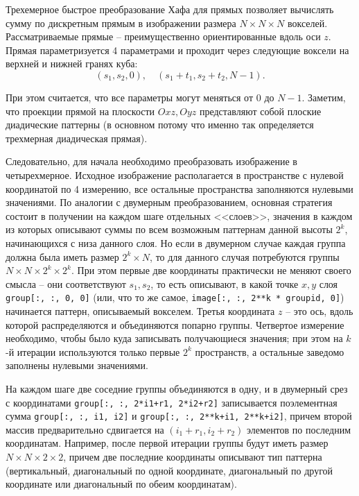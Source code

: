 
Трехемерное быстрое преобразование Хафа для прямых позволяет вычислять сумму по дискретным прямым в изображении размера $N \times N \times N$ вокселей. Рассматриваемые прямые -- преимущественно ориентированные вдоль оси $z$. Прямая параметризуется 4 параметрами и проходит через следующие воксели на верхней и нижней гранях куба:
\begin{equation*}
    (s_1, s_2, 0), \quad
    (s_1 + t_1, s_2 + t_2, N-1).
\end{equation*}

При этом считается, что все параметры могут меняться от $0$ до $N-1$. Заметим, что проекции прямой на плоскости $Oxz, Oyz$ представляют собой плоские диадические паттерны (в основном потому что именно так определяется трехмерная диадическая прямая).

Следовательно, для начала необходимо преобразовать изображение в четырехмерное. Исходное изображение располагается в пространстве с нулевой координатой по 4 измерению, все остальные пространства заполняются нулевыми значениями.
По аналогии с двумерным преобразованием, основная стратегия состоит в получении на каждом шаге отдельных <<слоев>>, значения в каждом из которых описывают суммы по всем возможным паттернам данной высоты $2^k$, начинающихся с низа данного слоя.
Но если в двумерном случае каждая группа должна была иметь размер $2^k \times N$, то для данного случая потребуются группы $N \times N \times 2^k \times 2^k$.
При этом первые две координаты практически не меняют своего смысла -- они соответствуют $s_1, s_2$, то есть описывают, в какой точке $x, y$ слоя \texttt{group[:, :, 0, 0]} (или, что то же самое, \texttt{image[:, :, 2**k * groupid, 0]}) начинается паттерн, описываемый вокселем. Третья координата $z$ -- это ось, вдоль которой распределяются и объединяются попарно группы. Четвертое измерение необходимо, чтобы было куда записывать получающиеся значения; при этом на $k$-й итерации используются только первые $2^k$ пространств, а остальные заведомо заполнены нулевыми значениями.

На каждом шаге две соседние группы объединяются в одну, и в двумерный срез с координатами \texttt{group[:, :, 2*i1+r1, 2*i2+r2]} записывается поэлементная сумма \texttt{group[:, :, i1, i2]} и \texttt{group[:, :, 2**k+i1, 2**k+i2]}, причем второй массив предварительно сдвигается на $(i_1+r_1, i_2+r_2)$ элементов по последним координатам. Например, после первой итерации группы будут иметь размер $N \times N \times 2 \times 2$, причем две последние координаты описывают тип паттерна (вертикальный, диагональный по одной координате, диагональный по другой координате или диагональный по обеим координатам).

